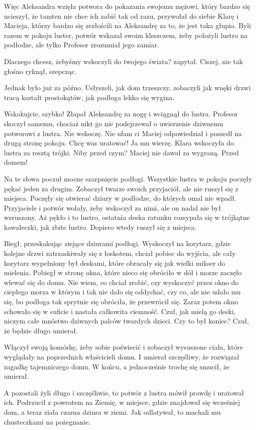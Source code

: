 Więc Aleksandra wzięła potwora do pokazania swojemu mężowi, który bardzo się ucieszył, że tamten nie chce ich zabić tak od razu, przywołał do siebie Klarę i Macieja, którzy bardzo się zezłościli na Aleksandrę za to, że jest taka głupia. 
Byli razem w pokoju luster, potwór wskazał swoim kleszczem, żeby położyli lustro na podłodze, ale tylko Profesor zrozumiał jego zamiar.
\begin{dialogue}
	\ds{} Dlaczego chcesz, żebyśmy wskoczyli do twojego świata? \dm{} zapytał.
	\ds{} Ciszej, nie tak głośno \dm{} ryknął, szepcząc. 
\end{dialogue}	
Jednak było już za późno. Usłyszeli, jak dom trzeszczy, zobaczyli jak wnęki drzwi tracą kształt prostokątów, jak podłoga lekko się wygina.
\begin{dialogue}
	\ds{} Wskakujcie, szybko! \dm{} Złapał Aleksandrę za nogę i wciągnął do lustra. Profesor skoczył samemu, chociaż nikt go nie podejrzewał o uwierzenie dziwnemu potworowi z lustra.
	\ds{} Nie wskoczę. Nie ufam ci \dm{} Maciej odpowiedział i poszedł na drugą stronę pokoju.
	\ds{} Chcę was uratować!
	\ds{} Ja mu wierzę. \dm{} Klara wskoczyła do lustra za resztą trójki.
	\ds{} Niby przed czym? \dm{} Maciej nie dawał za wygraną.
	\ds{} Przed domem!
\end{dialogue}
Na te słowa poczuł mocne szarpnięcie podłogi. Wszystkie lustra w pokoju poczęły pękać jeden za drugim.
Zobaczył twarze swoich przyjaciół, ale nie ruszył się z miejsca.
Poczęły się otwierać dziury w podłodze, do których omal nie wpadł.
Przyjaciele i potwór wołały, żeby wskoczył za nimi, ale on nadal nie był wzruszony. 
Aż pękło i to lustro, ostatnia deska ratunku rozsypała się w trójkątne kawałeczki, jak zbite lustro.
Dopiero wtedy ruszył się z miejsca.

Biegł, przeskakując ziejące dziurami podłogi. 
Wyskoczył na korytarz, gdzie kolejne drzwi zatrzaskiwały się z łoskotem, chciał pobiec do wyjścia, ale cały korytarz wypełniony był deskami, które obracały się jak wielki mikser do mielenia.
Pobiegł w stronę okna, które nieco się obróciło w dół i morze zaczęło wlewać się do domu.
Nie wiem, co chciał zrobić, czy wyskoczyć przez okno do ciepłego morza w którym i tak nie dało się oddychać, czy co, ale nie udało mu się, bo podłoga tak sprytnie się obróciła, że przewrócił się.
Zaraz potem okno schowało się w suficie i nastała całkowita ciemność. 
Czuł, jak mielą go deski, niczym całe mnóstwo dziwnych palców twardych dzieci.
Czy to był koniec? Czuł, że będzie długo umierał.

Włączył swoją komórkę, żeby sobie poświecić i zobaczył wysuszone ciała, które wyglądały na poprzednich właścicieli domu. I umierał szczęśliwy, że rozwiązał zagadkę tajemniczego domu. W końcu, a jednocześnie trochę się smucił, że umierał.

A pozostali żyli długo i szczęśliwie, to potwór z lustra mówił prawdę i uratował ich.
Podrzucił z powrotem na Ziemię, w miejsce, gdzie znajdował się wcześniej dom, a teraz ziała czarna dziura w ziemi. Jak odlatywał, to machali mu chusteczkami na pożegnanie.








